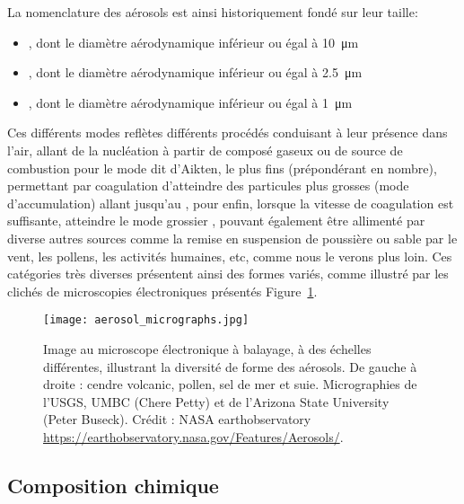 La nomenclature des aérosols est ainsi historiquement fondé sur leur taille:
\begin{itemize}
    \item \PMdix, dont le diamètre aérodynamique inférieur ou égal à \SI{10}{\um}
    \item \PMdc, dont le diamètre aérodynamique inférieur ou égal à \SI{2.5}{\um}
    \item \PMun, dont le diamètre aérodynamique inférieur ou égal à \SI{1}{\um}
\end{itemize}

Ces différents modes reflètes différents procédés conduisant à leur présence dans l'air,
allant de la nucléation à partir de composé gaseux ou de source de combustion pour le mode
dit d'Aikten, le plus fins (prépondérant en nombre), permettant par coagulation
d'atteindre des particules plus grosses (mode d'accumulation) allant jusqu'au \PMdc, pour
enfin, lorsque la vitesse de coagulation est suffisante, atteindre le mode grossier
\PMdix, pouvant également être allimenté par diverse autres sources comme la remise en
suspension de poussière ou sable par le vent, les pollens, les activités humaines, etc,
comme nous le verons plus loin.
Ces catégories très diverses présentent ainsi des formes variés, comme illustré par les
clichés de microscopies électroniques présentés Figure~\ref{fig:micrography}.

\begin{figure}[ht]
    \centering
    \texttt{[image: aerosol\_micrographs.jpg]}
    \caption{Image au microscope électronique à balayage, à des échelles différentes,
        illustrant la diversité de forme des aérosols.
        De gauche à droite : cendre volcanic, pollen, sel de mer et suie. Micrographies de
        l'USGS, UMBC (Chere Petty) et de l'Arizona State University (Peter Buseck). 
        Crédit : NASA earthobservatory \url{https://earthobservatory.nasa.gov/Features/Aerosols/}.
    }
    \label{fig:micrography}
\end{figure}

\subsection{Composition chimique}%
\label{ssub:composition_chimique}


